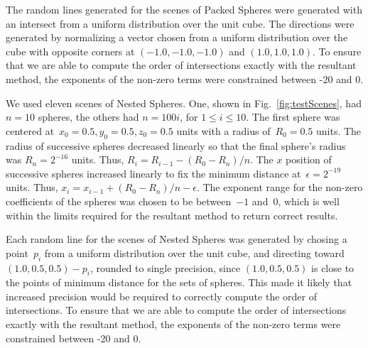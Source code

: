 \documentclass{cccg16}
\begin{document}
The random lines generated for the scenes of Packed Spheres were
generated with an intersect from a uniform distribution over the unit
cube.  The directions were generated by normalizing a vector chosen
from a uniform distribution over the cube with opposite corners at
$(-1.0, -1.0, -1.0)$ and $(1.0, 1.0, 1.0)$.  To ensure that we are
able to compute the order of intersections exactly with the resultant
method, the exponents of the non-zero terms were constrained between
-20 and 0.

We used eleven scenes of Nested Spheres. One, shown in
Fig.~\ref{fig:testScenes}, had $n=10$ spheres, the others had
$n=100i$, for $1\leq i \leq 10$.  The first sphere was centered
at~$x_0=0.5, y_0=0.5, z_0=0.5$ units with a radius of~$R_0=0.5$ units.
The radius of successive spheres decreased linearly so that the final
sphere's radius was $R_n=2^{-16}$ units.  Thus,
$R_i=R_{i-1}-(R_0-R_n)/n$.  The $x$ position of successive spheres
increased linearly to fix the minimum distance at~$\epsilon=2^{-19}$
units. Thus, $x_i=x_{i-1}+(R_0-R_n)/n-\epsilon$.  The exponent range
for the non-zero coefficients of the spheres was chosen to be
between~$-1$ and~$0$, which is well within the limits required for the
resultant method to return correct results.

Each random line for the scenes of Nested Spheres was
generated by chosing a point~$p_i$ from a uniform distribution over the
unit cube, and directing toward $(1.0, 0.5, 0.5)-p_i$, rounded to single precision, since
$(1.0, 0.5, 0.5)$ is close to the points of minimum
distance for the sets of spheres.  This made it  likely that
increased precision would be required to correctly compute the order
of intersections.  To ensure that we are able to compute the order of
intersections exactly with the resultant method, the exponents of the
non-zero terms were constrained between -20 and 0.
\end{document}
